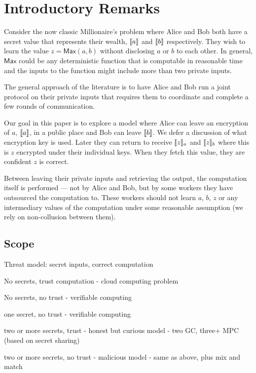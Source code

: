 \section{Introductory Remarks}

Consider the now classic Millionaire's problem where Alice and Bob both have a secret value that represents their wealth, $\llbracket a \rrbracket$ and $\llbracket b \rrbracket$ respectively. They wish to learn the value $z=\mathsf{Max}(a,b)$ without disclosing $a$ or $b$ to each other. In general, $\mathsf{Max}$ could be any deterministic function that is computable in reasonable time and the inputs to the function might include more than two private inputs. 

The general approach of the literature is to have Alice and Bob run a joint protocol on their private inputs that requires them to coordinate and complete a few rounds of communication.

Our goal in this paper is to explore a model where Alice can leave an encryption of $a$, $\llbracket a \rrbracket$, in a public place and Bob can leave $\llbracket b \rrbracket$. We defer a discussion of what encryption key is used. Later they can return to receive $\llbracket z \rrbracket_a$ and $\llbracket z \rrbracket_b$ where this is $z$ encrypted under their individual keys. When they fetch this value, they are confident $z$ is correct.

Between leaving their private inputs and retrieving the output, the computation itself is performed --- not by Alice and Bob, but by some workers they have outsourced the computation to. These workers should not learn $a$, $b$, $z$ or any intermediary values of the computation under some reasonable assumption (we rely on non-collusion between them). 


\subsection{Scope}

Threat model: secret inputs, correct computation


No secrets, trust computation
- cloud computing problem

No secrets, no trust
- verifiable computing

one secret, no trust
- verifiable computing

two or more secrets, trust
- honest but curious model - two GC, three+ MPC (based on secret sharing)

two or more secrets, no trust
- malicious model - same as above, plus mix and match 

